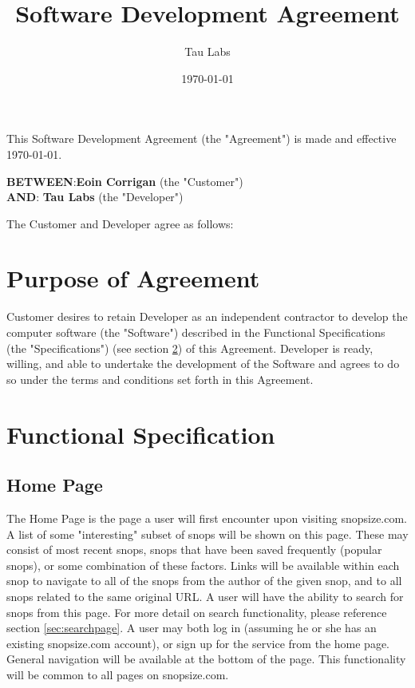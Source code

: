 \documentclass[11pt]{article}
\begin{document}
\title{Software Development Agreement}
\author{Tau Labs}
\date{\today}
\maketitle
\section*{}
This Software Development Agreement (the "Agreement") is made and effective {\today}.
\begin{tabbing}
{\bf BETWEEN}:\hspace{0.2in}\={\bf Eoin Corrigan} (the "Customer") \\
{\bf AND}:\> {\bf Tau Labs } (the "Developer") 
\end{tabbing}
The Customer and Developer agree as follows:
\section{Purpose of Agreement}
Customer desires to retain Developer as an independent contractor to develop the computer software (the "Software") described in the Functional Specifications (the "Specifications") (see section \ref{sec:functionalspec}) of this Agreement. Developer is ready, willing, and able to undertake the development of the Software and agrees to do so under the terms and conditions set forth in this Agreement.
\section{Functional Specification}
\label{sec:functionalspec}
\subsection{Home Page}
The Home Page is the page a user will first encounter upon visiting snopsize.com. A list of some "interesting" subset of snops will be shown on this page. These may consist of most recent snops, snops that have been saved frequently (popular snops), or some combination of these factors. Links will be available within each snop to navigate to all of the snops from the author of the given snop, and to all snops related to the same original URL. A user will have the ability to search for snops from this page. For more detail on search functionality, please reference section \ref{sec:searchpage}. A user may both log in (assuming he or she has an existing snopsize.com account), or sign up for the service from the home page. General navigation will be available at the bottom of the page. This functionality will be common to all pages on snopsize.com.
\end{document}
